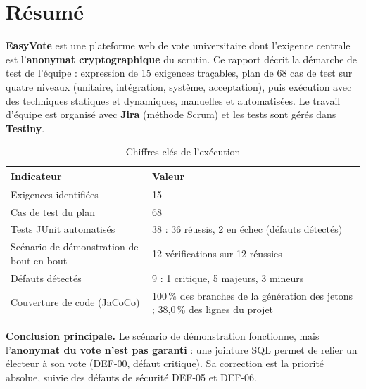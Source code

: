 \documentclass[12pt,a4paper]{report}
\begin{document}
\chapter*{Résumé}

\textbf{EasyVote} est une plateforme web de vote universitaire dont l'exigence centrale est l'\textbf{anonymat cryptographique} du scrutin. Ce rapport décrit la démarche de test de l'équipe : expression de 15 exigences traçables, plan de 68 cas de test sur quatre niveaux (unitaire, intégration, système, acceptation), puis exécution avec des techniques statiques et dynamiques, manuelles et automatisées. Le travail d'équipe est organisé avec \textbf{Jira} (méthode Scrum) et les tests sont gérés dans \textbf{Testiny}.

\begin{table}[H]
\centering
\caption{Chiffres clés de l'exécution}
\small
\begin{tabularx}{\textwidth}{@{}p{6.4cm}X@{}}
\toprule
\rowcolor{evlight}\textbf{Indicateur} & \textbf{Valeur}\\
\midrule
Exigences identifiées & 15\\
Cas de test du plan & 68\\
Tests JUnit automatisés & 38 : 36 réussis, 2 en échec (défauts détectés)\\
Scénario de démonstration de bout en bout & 12 vérifications sur 12 réussies\\
Défauts détectés & 9 : 1 critique, 5 majeurs, 3 mineurs\\
Couverture de code (JaCoCo) & 100\,\% des branches de la génération des jetons ; 38,0\,\% des lignes du projet\\
\bottomrule
\end{tabularx}
\end{table}

\textbf{Conclusion principale.} Le scénario de démonstration fonctionne, mais l'\textbf{anonymat du vote n'est pas garanti} : une jointure SQL permet de relier un électeur à son vote (DEF-00, défaut critique). Sa correction est la priorité absolue, suivie des défauts de sécurité DEF-05 et DEF-06.

\clearpage
\tableofcontents
\clearpage
\listoftables
\listoffigures
\clearpage
\end{document}
